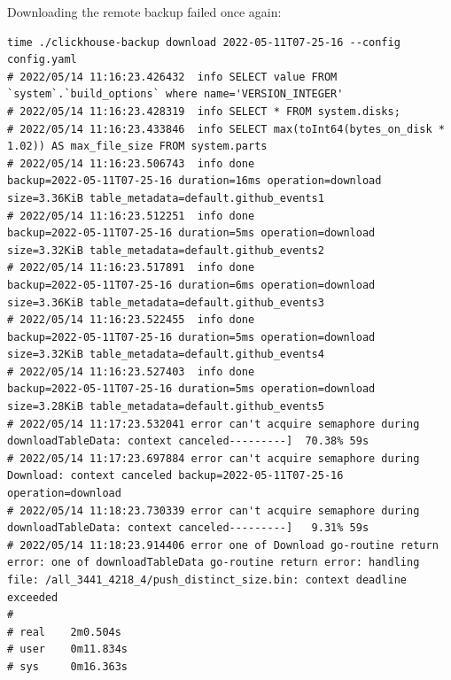 Downloading the remote backup failed once again:
\begin{verbatim}
time ./clickhouse-backup download 2022-05-11T07-25-16 --config config.yaml
# 2022/05/14 11:16:23.426432  info SELECT value FROM `system`.`build_options` where name='VERSION_INTEGER'
# 2022/05/14 11:16:23.428319  info SELECT * FROM system.disks;
# 2022/05/14 11:16:23.433846  info SELECT max(toInt64(bytes_on_disk * 1.02)) AS max_file_size FROM system.parts
# 2022/05/14 11:16:23.506743  info done                      backup=2022-05-11T07-25-16 duration=16ms operation=download size=3.36KiB table_metadata=default.github_events1
# 2022/05/14 11:16:23.512251  info done                      backup=2022-05-11T07-25-16 duration=5ms operation=download size=3.32KiB table_metadata=default.github_events2
# 2022/05/14 11:16:23.517891  info done                      backup=2022-05-11T07-25-16 duration=6ms operation=download size=3.36KiB table_metadata=default.github_events3
# 2022/05/14 11:16:23.522455  info done                      backup=2022-05-11T07-25-16 duration=5ms operation=download size=3.32KiB table_metadata=default.github_events4
# 2022/05/14 11:16:23.527403  info done                      backup=2022-05-11T07-25-16 duration=5ms operation=download size=3.28KiB table_metadata=default.github_events5
# 2022/05/14 11:17:23.532041 error can't acquire semaphore during downloadTableData: context canceled---------]  70.38% 59s
# 2022/05/14 11:17:23.697884 error can't acquire semaphore during Download: context canceled backup=2022-05-11T07-25-16 operation=download
# 2022/05/14 11:18:23.730339 error can't acquire semaphore during downloadTableData: context canceled---------]   9.31% 59s
# 2022/05/14 11:18:23.914406 error one of Download go-routine return error: one of downloadTableData go-routine return error: handling file: /all_3441_4218_4/push_distinct_size.bin: context deadline exceeded
#
# real    2m0.504s
# user    0m11.834s
# sys     0m16.363s
\end{verbatim}
